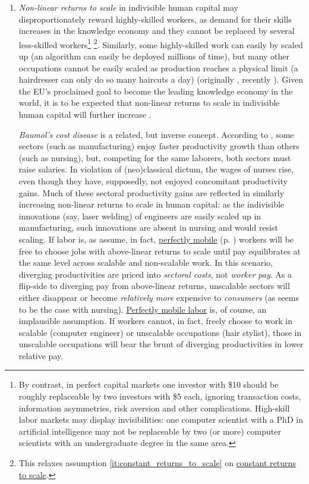 \begin{enumerate}
	\item {} \label{it:non-linear_returns} \emph{Non-linear returns to scale} in indivisible human capital may disproportionately reward highly-skilled workers, as demand for their skills increases in the knowledge economy and they cannot be replaced by several less-skilled workers\footnote{
		By contrast, in perfect capital markets one investor with \$10 should be roughly replaceable by two investors with \$5 each, ignoring transaction costs, information asymmetries, risk aversion and other complications. High-skill labor markets may display invisibilities:  one computer scientist with a PhD in artificial intelligence may not be replaceable by two (or more) computer scientists with an undergraduate degree in the same area.} \footnote{
		This relaxes  assumption \ref{it:constant_returns_to_scale} on \hyperref[it:constant_returns_to_scale]{constant returns to scale}.}.
	Similarly, some highly-skilled work can easily by scaled up (an algorithm can  easily be deployed millions of time), but many other occupations cannot be easily scaled as production reaches a physical limit (a hairdresser can only do so many haircuts a day) (originally \citealt{Rosen1981}, recently \citealt{Taleb2007}). Given the \gls{EU}'s proclaimed goal to become the leading knowledge economy in the world, it is to be expected that non-linear returns to scale in indivisible human capital will further increase \citep{Commission2007}.
	
	\emph{Baumol's cost disease} is a related, but inverse concept. According to \cite{Baumol1965}, some sectors (such as  manufacturing) enjoy faster productivity growth than others (such as nursing), but, competing for the same laborers, both sectors must raise salaries. In violation of (neo)classical dictum, the wages of nurses rise, even though they have, supposedly, not enjoyed concomitant productivity gains. Much of these sectoral productivity gains are reflected in similarly increasing non-linear returns to scale in human capital: as the indivisible innovations (say, laser welding) of engineers are easily scaled up in manufacturing, such innovations are absent in nursing and would resist scaling. If labor is, as \cite{Baumol1965} assume, in fact, \hyperref[it:perfect_factor_mobility]{perfectly mobile} (p. \pageref{sec:perfect_competition}) workers will be free to choose jobs with above-linear returns to scale until pay equilibrates at the same level across scalable and non-scalable work. In this scenario, diverging productivities are priced into \emph{sectoral costs}, not \emph{worker pay}. As a flip-side to diverging pay from above-linear returns, unscalable sectors will either disappear or become \emph{relatively more} expensive to \emph{consumers} (as seems to be the case with nursing). \hyperref[it:perfect_factor_mobility]{Perfectly mobile labor} is, of course, an implausible assumption. If workers cannot, in fact, freely choose to work in scalable (computer engineer) or unscalable occupations (hair stylist), those in unscalable occupations will bear the brunt of diverging productivities in lower relative pay. 
	

\end{enumerate}
